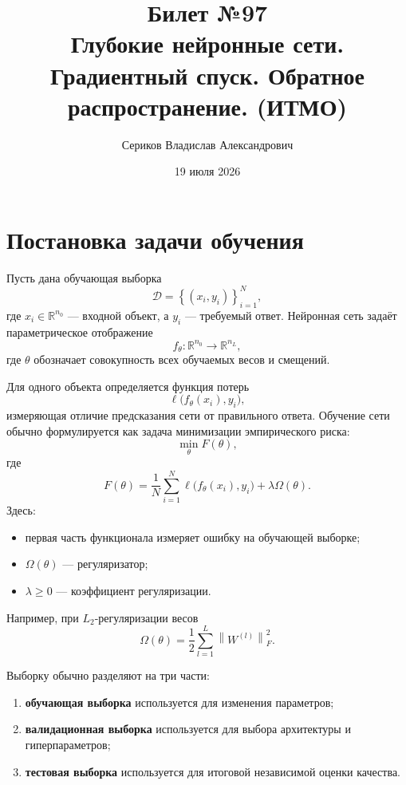 \documentclass[12pt,a4paper]{article}
\title{Билет №97 \\ \small Глубокие нейронные сети. Градиентный спуск. Обратное распространение. (ИТМО)}
\author{Сериков Владислав Александрович}
\date{19 июля 2026}
\theoremstyle{plain}
\theoremstyle{definition}
\theoremstyle{remark}
\newcommand{\R}{\mathbb{R}}
\newcommand{\norm}[1]{\left\lVert #1 \right\rVert}
\begin{document}
\maketitle
\tableofcontents
\newpage

\section{Постановка задачи обучения}

Пусть дана обучающая выборка
\[
    \mathcal{D}
    =
    \left\{
        \left(x_i,y_i\right)
    \right\}_{i=1}^{N},
\]
где $x_i\in\R^{n_0}$ --- входной объект, а $y_i$ --- требуемый
ответ. Нейронная сеть задаёт параметрическое отображение
\[
    f_\theta\colon \R^{n_0}\to\R^{n_L},
\]
где $\theta$ обозначает совокупность всех обучаемых весов и
смещений.

Для одного объекта определяется функция потерь
\[
    \ell\bigl(f_\theta(x_i),y_i\bigr),
\]
измеряющая отличие предсказания сети от правильного ответа.
Обучение сети обычно формулируется как задача минимизации
эмпирического риска:
\[
    \min_{\theta} F(\theta),
\]
где
\[
    F(\theta)
    =
    \frac{1}{N}
    \sum_{i=1}^{N}
    \ell\bigl(f_\theta(x_i),y_i\bigr)
    +
    \lambda\Omega(\theta).
\]
Здесь:

\begin{itemize}
    \item первая часть функционала измеряет ошибку на обучающей
    выборке;
    \item $\Omega(\theta)$ --- регуляризатор;
    \item $\lambda\geq 0$ --- коэффициент регуляризации.
\end{itemize}

Например, при $L_2$-регуляризации весов
\[
    \Omega(\theta)
    =
    \frac{1}{2}
    \sum_{l=1}^{L}
    \norm{W^{(l)}}_F^2.
\]

Выборку обычно разделяют на три части:

\begin{enumerate}
    \item \textbf{обучающая выборка} используется для изменения
    параметров;
    \item \textbf{валидационная выборка} используется для выбора
    архитектуры и гиперпараметров;
    \item \textbf{тестовая выборка} используется для итоговой
    независимой оценки качества.
\end{enumerate}
\end{document}

